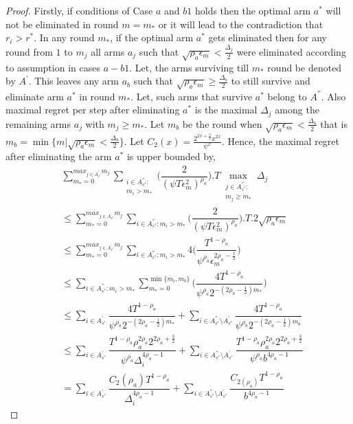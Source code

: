 \begin{proof}
Firstly, if conditions of  Case $a$ and $b1$ holds then the optimal arm $a^{*}$ will not be eliminated in round $m=m_{*}$ or it will lead to the contradiction that $r_{i}>r^{*}$. In any round $m_{*}$, if the optimal arm $a^{*}$ gets eliminated then for any round from $1$ to $m_{j}$ all arms $a_{j}$ such that $\sqrt{\rho_{a}\epsilon_{m}}<\frac{\Delta_{j}}{2}$ were eliminated according to assumption in cases $a-b1$. Let, the arms surviving till $m_{*}$ round be denoted by $A^{'}$. This leaves any arm $a_{b}$ such that $\sqrt{\rho_{a}\epsilon_{m}}\geq\frac{\Delta_{b}}{2}$ to still survive and eliminate arm $a^{*}$ in round $m_{*}$. Let, such arms that survive $a^{*}$ belong to $A^{''}$. Also maximal regret per step after eliminating $a^{*}$ is the maximal $\Delta_{j}$ among the remaining arms $a_{j}$ with $m_{j}\geq m_{*}$.  Let $m_{b}$ be the round when $\sqrt{\rho_{a}\epsilon_{m}}<\frac{\Delta_{b}}{2}$ that is $m_{b}=\min\lbrace m|\sqrt{\rho_{a}\epsilon_{m}}<\frac{\Delta_{b}}{2}\rbrace$. Let $C_2(x) = \frac{2^{2x+\frac{3}{2}}x^{2x}}{\psi^{x}}$. Hence, the maximal regret after eliminating the arm $a^{*}$ is upper bounded by, 
\begin{align*}
&\sum_{m_{*}=0}^{max_{j\in A^{'}_{s^{*}}}m_{j}}\sum_{\substack{i\in A^{''}_{s^{*}}: \\ m_{i}>m_{*}}}\bigg(\dfrac{2}{(\psi  T\epsilon_{m}^{2})^{\rho_{a}}} \bigg).T\max_{\substack{j\in A^{''}_{s^{*}}: \\ m_{j}\geq m_{*}}}{\Delta}_{j}\\
&\leq\sum_{m_{*}=0}^{max_{j\in A^{'}_{s^{*}}}m_{j}}\sum_{i\in A^{''}_{s^{*}}:m_{i}>m_{*}}\bigg(\dfrac{2}{(\psi  T\epsilon_{m}^{2})^{\rho_{a}}} \bigg).T.2\sqrt{\rho_{a}\epsilon_{m}} \\
&\leq\sum_{m_{*}=0}^{max_{j\in A^{'}_{s^{*}}}m_{j}}\sum_{i\in A^{''}_{s^{*}}:m_{i}>m_{*}}4\bigg(\dfrac{T^{1-\rho_{a}}}{\psi^{\rho_{a}}\epsilon_{m}^{2\rho_{a}-\frac{1}{2}}} \bigg)\\
&\leq\sum_{i\in A^{''}_{s^{*}}:m_{i}>m_{*}}\sum_{m_{*}=0}^{\min{\lbrace m_{i},m_{b}\rbrace}}\bigg(\dfrac{4T^{1-\rho_{a}}}{\psi^{\rho_{a}}2^{-(2\rho_{a}-\frac{1}{2})m_{*}}} \bigg)\\
&\leq\sum_{i\in A^{'}_{s^{*}}}\dfrac{4T^{1-\rho_{a}}}{\psi^{\rho_{a}}2^{-(2\rho_{a}-\frac{1}{2})m_{*}}} +\sum_{i\in A^{''}_{s^{*}}\setminus A^{'}_{s^{*}}}\dfrac{4T^{1-\rho_{a}}}{\psi^{\rho_{a}}2^{-(2\rho_{a}-\frac{1}{2})m_{b}}} \\
&\leq\sum_{i\in A^{'}_{s^{*}}}\dfrac{T^{1-\rho_{a}}\rho_{a}^{2\rho_{a}}2^{2\rho_{a}+\frac{3}{2}}}{\psi^{\rho_{a}}\Delta_{i}^{4\rho_{a}-1}} +\sum_{i\in A^{''}_{s^{*}}\setminus A^{'}_{s^{*}}}\dfrac{T^{1-\rho_{a}}\rho_{a}^{2\rho_{a}}2^{2\rho_{a}+\frac{3}{2}}}{\psi^{\rho_{a}}b^{4\rho_{a}-1}} \\
& = \sum_{i\in A^{'}_{s^{*}}}\dfrac{ C_{2}(\rho_{a}) T^{1-\rho_{a}}}{\Delta_{i}^{4\rho_{a}-1}} +\sum_{i\in A^{''}_{s^{*}}\setminus A^{'}_{s^{*}}}\dfrac{C_{2(\rho_{a})}T^{1-\rho_{a}}}{b^{4\rho_{a}-1}}
\end{align*}


\end{proof}

